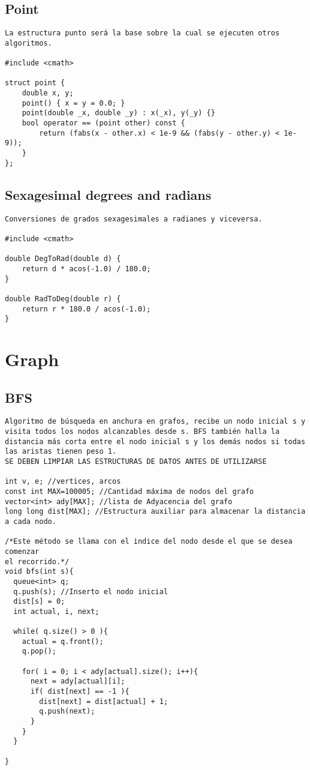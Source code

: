\documentclass[10pt,letterpaper,twocolumn,twosided]{article}
\begin{document}
\subsection{Point}
\begin{lstlisting}
La estructura punto será la base sobre la cual se ejecuten otros algoritmos. 

#include <cmath>

struct point { 
	double x, y;
  	point() { x = y = 0.0; }
  	point(double _x, double _y) : x(_x), y(_y) {}        
  	bool operator == (point other) const {
   		return (fabs(x - other.x) < 1e-9 && (fabs(y - other.y) < 1e-9)); 
   	}
};\end{lstlisting}

\subsection{Sexagesimal degrees and radians}
\begin{lstlisting}
Conversiones de grados sexagesimales a radianes y viceversa.

#include <cmath>

double DegToRad(double d) { 
	return d * acos(-1.0) / 180.0; 
}

double RadToDeg(double r) { 
	return r * 180.0 / acos(-1.0); 
}
\end{lstlisting}

\section{Graph}

\subsection{BFS}
\begin{lstlisting}
Algoritmo de búsqueda en anchura en grafos, recibe un nodo inicial s y visita todos los nodos alcanzables desde s. BFS también halla la distancia más corta entre el nodo inicial s y los demás nodos si todas las aristas tienen peso 1.
SE DEBEN LIMPIAR LAS ESTRUCTURAS DE DATOS ANTES DE UTILIZARSE

int v, e; //vertices, arcos
const int MAX=100005; //Cantidad máxima de nodos del grafo
vector<int> ady[MAX]; //lista de Adyacencia del grafo
long long dist[MAX]; //Estructura auxiliar para almacenar la distancia a cada nodo.

/*Este método se llama con el indice del nodo desde el que se desea comenzar
el recorrido.*/
void bfs(int s){
  queue<int> q;
  q.push(s); //Inserto el nodo inicial
  dist[s] = 0;
  int actual, i, next;
       
  while( q.size() > 0 ){
    actual = q.front();
    q.pop();

    for( i = 0; i < ady[actual].size(); i++){
      next = ady[actual][i];
      if( dist[next] == -1 ){
        dist[next] = dist[actual] + 1;
        q.push(next);
      }
    }
  }

}
\end{lstlisting}
\end{document}
